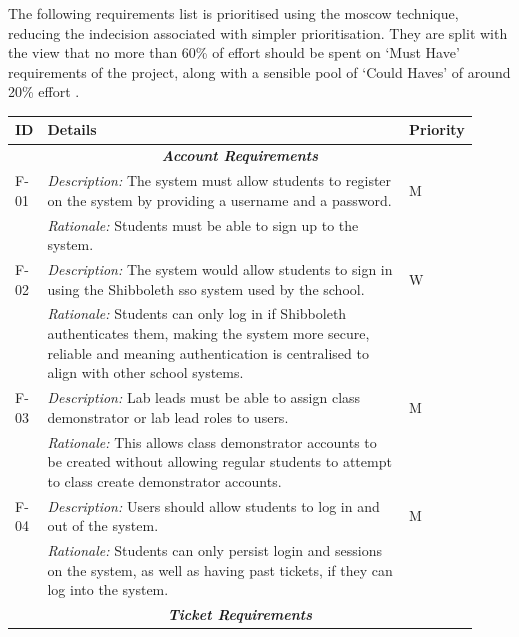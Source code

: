 The following requirements list is prioritised using the \gls{moscow} technique, reducing the indecision associated with simpler prioritisation. They are split with the view that no more than 60\% of effort should be spent on `Must Have' requirements of the project, along with a sensible pool of `Could Haves' of around 20\% effort \cite{dsdm}.

\begin{table}[H]
\small
\begin{tabular}{|p{0.05\linewidth} | p{0.78\linewidth} |p{0.09\linewidth}|}
 \hline
 \textbf{ID} & \textbf{Details} & \textbf{Priority} \\
 \hline
 
 \multicolumn{3}{c}{\textit{\textbf{Account Requirements}}}\\
 
 \hline
 F-01 & \textit{Description:} The system must allow students to register on the system by providing a username and a password. & M\\
  \cline{2-2}
  & \textit{Rationale:} Students must be able to sign up to the system. & \\

  
   \hline\hline
 F-02 & \textit{Description:} The system would allow students to sign in using the Shibboleth \gls{sso} system used by the school. & W\\
  \cline{2-2}
  & \textit{Rationale:} Students can only log in if Shibboleth authenticates them, making the system more secure, reliable and meaning authentication is centralised to align with other school systems. & \\

  
     \hline\hline
 F-03 & \textit{Description:} Lab leads must be able to assign class demonstrator or lab lead roles to users. & M\\
  \cline{2-2}
  & \textit{Rationale:} This allows class demonstrator accounts to be created without allowing regular students to attempt to class create demonstrator accounts. & \\
  
   \hline\hline
 F-04 & \textit{Description:} Users should allow students to log in and out of the system. & M\\
  \cline{2-2}
  & \textit{Rationale:} Students can only persist login and sessions on the system, as well as having past tickets, if they can log into the system. & \\
\hline
  
   \multicolumn{3}{c}{\textit{\textbf{Ticket Requirements}}}\\
  

\end{tabular}
\end{table}
